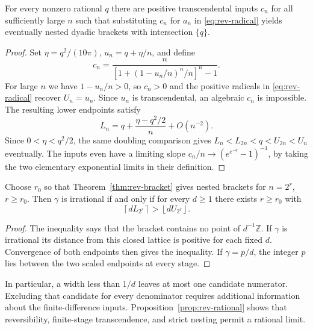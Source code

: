 \documentclass[11pt,a4paper]{article}
\theoremstyle{definition}\newtheorem{definition}[theorem]{Definition}\newtheorem{example}[theorem]{Example}
\theoremstyle{remark}\newtheorem{remark}[theorem]{Remark}
\begin{document}
\begin{proposition}\label{prop:rev-rational}
For every nonzero rational $q$ there are positive transcendental inputs $c_n$ for all sufficiently large $n$ such that substituting $c_n$ for $a_n$ in \eqref{eq:rev-radical} yields eventually nested dyadic brackets with intersection $\{q\}$.
\end{proposition}
\begin{proof}
Set $\eta=q^2/(10\pi)$, $u_n=q+\eta/n$, and define
\[
 c_n=\frac{n}{[1+(1-u_n/n)^n/n]^n-1}.
\]
For large $n$ we have $1-u_n/n>0$, so $c_n>0$ and the positive radicals in \eqref{eq:rev-radical} recover $U_n=u_n$. Since $u_n$ is transcendental, an algebraic $c_n$ is impossible. The resulting lower endpoints satisfy
\[
 L_n=q+\frac{\eta-q^2/2}{n}+O(n^{-2}).
\]
Since $0<\eta<q^2/2$, the same doubling comparison gives $L_n<L_{2n}<q<U_{2n}<U_n$ eventually. The inputs even have a limiting slope $c_n/n\to(e^{e^{-q}}-1)^{-1}$, by taking the two elementary exponential limits in their definition.
\end{proof}

\begin{corollary}\label{cor:rev-lattice}
Choose $r_0$ so that Theorem~\ref{thm:rev-bracket} gives nested brackets for $n=2^r$, $r\ge r_0$. Then $\gamma$ is irrational if and only if for every $d\ge1$ there exists $r\ge r_0$ with
\[
 \left\lceil d L_{2^r}\right\rceil>\left\lfloor d U_{2^r}\right\rfloor.
\]
\end{corollary}
\begin{proof}
The inequality says that the bracket contains no point of $d^{-1}\mathbb Z$. If $\gamma$ is irrational its distance from this closed lattice is positive for each fixed $d$. Convergence of both endpoints then gives the inequality. If $\gamma=p/d$, the integer $p$ lies between the two scaled endpoints at every stage.
\end{proof}
In particular, a width less than $1/d$ leaves at most one candidate numerator. Excluding that candidate for every denominator requires additional information about the finite-difference inputs. Proposition~\ref{prop:rev-rational} shows that reversibility, finite-stage transcendence, and strict nesting permit a rational limit.
\end{document}
